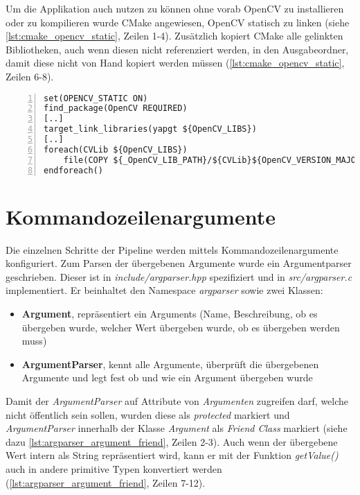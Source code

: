 Um die Applikation auch nutzen zu können ohne vorab OpenCV zu installieren oder zu kompilieren wurde CMake angewiesen, OpenCV statisch zu linken (siehe \autoref{lst:cmake_opencv_static}, Zeilen 1-4).
Zusätzlich kopiert CMake alle gelinkten Bibliotheken, auch wenn diesen nicht referenziert werden, in den Ausgabeordner, damit diese nicht von Hand kopiert werden müssen (\autoref{lst:cmake_opencv_static}, Zeilen 6-8).

\begin{lstlisting}[numbers=left, breaklines=true,breakatwhitespace=false,label=lst:cmake_opencv_static, caption=Ausschnitt von CMakeLists.txt um OpenCV statisch zu linken]
set(OPENCV_STATIC ON)
find_package(OpenCV REQUIRED)
[..]
target_link_libraries(yapgt ${OpenCV_LIBS})
[..]
foreach(CVLib ${OpenCV_LIBS})
    file(COPY ${_OpenCV_LIB_PATH}/${CVLib}${OpenCV_VERSION_MAJOR}${OpenCV_VERSION_MINOR}${OpenCV_VERSION_PATCH}d.dll DESTINATION ${CMAKE_BINARY_DIR})
endforeach()
\end{lstlisting}


\section{Kommandozeilenargumente}
Die einzelnen Schritte der Pipeline werden mittels Kommandozeilenargumente konfiguriert.
Zum Parsen der übergebenen Argumente wurde ein Argumentparser geschrieben.
Dieser ist in \emph{include/argparser.hpp} spezifiziert und in \emph{src/argparser.c} implementiert.
Er beinhaltet den Namespace \emph{argparser} sowie zwei Klassen:
\begin{itemize}
\item \textbf{Argument}, repräsentiert ein Arguments (Name, Beschreibung, ob es übergeben wurde, welcher Wert übergeben wurde, ob es übergeben werden muss)
\item \textbf{ArgumentParser}, kennt alle Argumente, überprüft die übergebenen Argumente und legt fest ob und wie ein Argument übergeben wurde
\end{itemize}

Damit der \emph{ArgumentParser} auf Attribute von \emph{Argumenten} zugreifen darf, welche nicht öffentlich sein sollen, wurden diese als \emph{protected} markiert und \emph{ArgumentParser} innerhalb der Klasse \emph{Argument} als \emph{Friend Class} markiert (siehe dazu \autoref{lst:argparser_argument_friend}, Zeilen 2-3).
Auch wenn der übergebene Wert intern als String repräsentiert wird, kann er mit der Funktion \emph{getValue()} auch in andere primitive Typen konvertiert werden (\autoref{lst:argparser_argument_friend}, Zeilen 7-12).

